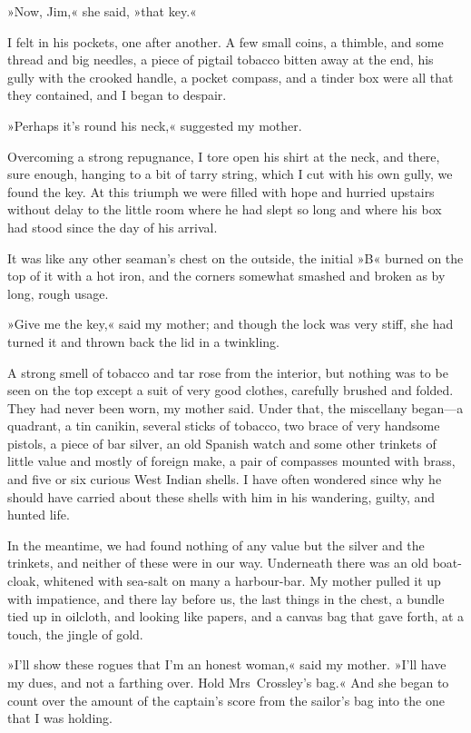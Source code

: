 »Now, Jim,« she said, »that key.«

I felt in his pockets, one after another. A few small coins, a thimble, and some thread and big needles, a piece of pigtail tobacco bitten away at the end, his gully with the crooked handle, a pocket compass, and a tinder box were all that they contained, and I began to despair.

»Perhaps it's round his neck,« suggested my mother.

Overcoming a strong repugnance, I tore open his shirt at the neck, and there, sure enough, hanging to a bit of tarry string, which I cut with his own gully, we found the key. At this triumph we were filled with hope and hurried upstairs without delay to the little room where he had slept so long and where his box had stood since the day of his arrival.

It was like any other seaman's chest on the outside, the initial »B« burned on the top of it with a hot iron, and the corners somewhat smashed and broken as by long, rough usage.

»Give me the key,« said my mother; and though the lock was very stiff, she had turned it and thrown back the lid in a twinkling.

A strong smell of tobacco and tar rose from the interior, but nothing was to be seen on the top except a suit of very good clothes, carefully brushed and folded. They had never been worn, my mother said. Under that, the miscellany began—a quadrant, a tin canikin, several sticks of tobacco, two brace of very handsome pistols, a piece of bar silver, an old Spanish watch and some other trinkets of little value and mostly of foreign make, a pair of compasses mounted with brass, and five or six curious West Indian shells. I have often wondered since why he should have carried about these shells with him in his wandering, guilty, and hunted life.

In the meantime, we had found nothing of any value but the silver and the trinkets, and neither of these were in our way. Underneath there was an old boat-cloak, whitened with sea-salt on many a harbour-bar. My mother pulled it up with impatience, and there lay before us, the last things in the chest, a bundle tied up in oilcloth, and looking like papers, and a canvas bag that gave forth, at a touch, the jingle of gold.

»I'll show these rogues that I'm an honest woman,« said my mother. »I'll have my dues, and not a farthing over. Hold Mrs~Crossley's bag.« And she began to count over the amount of the captain's score from the sailor's bag into the one that I was holding.

